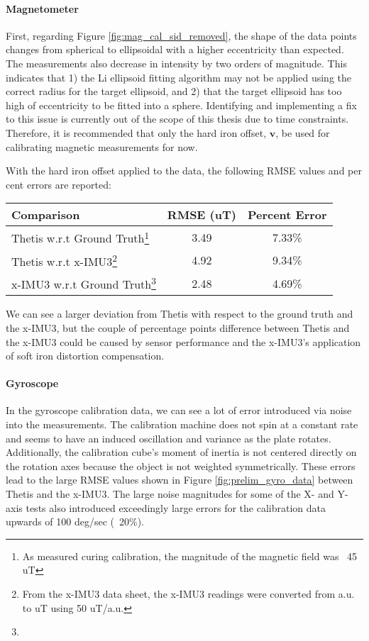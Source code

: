 \paragraph*{Magnetometer} First, regarding Figure \ref{fig:mag_cal_sid_removed}, the shape of the data points changes from spherical to ellipsoidal with a higher eccentricity than expected.
The measurements also decrease in intensity by two orders of magnitude. 
This indicates that 1) the Li ellipsoid fitting algorithm may not be applied using the correct radius for the target ellipsoid, and 2) that the target ellipsoid has too high of eccentricity to be fitted into a sphere.
Identifying and implementing a fix to this issue is currently out of the scope of this thesis due to time constraints.
Therefore, it is recommended that only the hard iron offset, $\pmb{v}$, be used for calibrating magnetic measurements for now.

With the hard iron offset applied to the data, the following RMSE values and per cent errors are reported:

\begin{table}[h!]
    \renewcommand{\arraystretch}{1.75}
    \centering
    \begin{tabular}{| m{5cm} | c | c |}
        \hline
        \textbf{Comparison} & \textbf{RMSE (uT)} & \textbf{Percent Error} \\
        \hline
        Thetis w.r.t Ground Truth\footnote[1]{As measured curing calibration, the magnitude of the magnetic field was ~45 uT} & 3.49 & 7.33\% \\
        Thetis w.r.t x-IMU3\footnote[2]{From the x-IMU3 data sheet, the x-IMU3 readings were converted from a.u. to uT using 50 uT/a.u.} & 4.92 & 9.34\% \\
        x-IMU3 w.r.t Ground Truth\footnote[2]{} & 2.48 & 4.69\% \\
        \hline
    \end{tabular}
\end{table}

We can see a larger deviation from Thetis with respect to the ground truth and the x-IMU3, but the couple of percentage points difference between Thetis and the x-IMU3 could be caused by sensor performance and the x-IMU3's application of soft iron distortion compensation.

\paragraph*{Gyroscope} In the gyroscope calibration data, we can see a lot of error introduced via noise into the measurements.
The calibration machine does not spin at a constant rate and seems to have an induced oscillation and variance as the plate rotates.
Additionally, the calibration cube's moment of inertia is not centered directly on the rotation axes because the object is not weighted symmetrically.
These errors lead to the large RMSE values shown in Figure \ref{fig:prelim_gyro_data} between Thetis and the x-IMU3.
The large noise magnitudes for some of the X- and Y-axis tests also introduced exceedingly large errors for the calibration data upwards of 100 deg/sec (~20\%).

